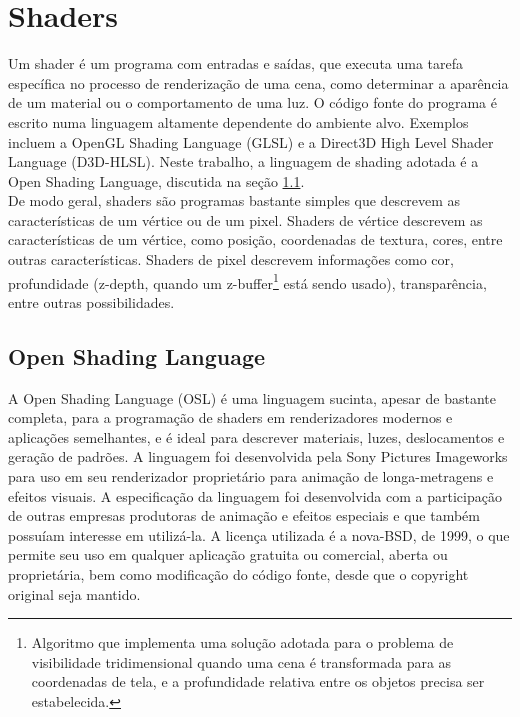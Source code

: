 \documentclass[12pt, a4paper, oneside]{book}
\begin{document}
 \section{Shaders}
 \label{shaders}

Um shader é um programa com entradas e saídas, que executa uma tarefa específica no processo de renderização de uma cena, como determinar a aparência de um material ou o comportamento de uma luz. O código fonte do programa é escrito numa linguagem altamente dependente do ambiente alvo. Exemplos incluem a OpenGL Shading Language (GLSL) e a Direct3D High Level Shader Language (D3D-HLSL). Neste trabalho, a linguagem de shading adotada é a Open Shading Language, discutida na seção \ref{osl}.\\

De modo geral, shaders são programas bastante simples que descrevem as características de um vértice ou de um pixel. Shaders de vértice descrevem as características de um vértice, como posição, coordenadas de textura, cores, entre outras características. Shaders de pixel descrevem informações como cor, profundidade (z-depth, quando um z-buffer\footnote{Algoritmo que implementa uma solução adotada para o problema de visibilidade tridimensional quando uma cena é transformada para as coordenadas de tela, e a profundidade relativa entre os objetos precisa ser estabelecida.} está sendo usado), transparência, entre outras possibilidades. 


\subsection{Open Shading Language} 
\label{osl}

A Open Shading Language (OSL) é uma linguagem sucinta, apesar de bastante completa, para a programação de shaders em renderizadores modernos e aplicações semelhantes, e é ideal para descrever materiais, luzes, deslocamentos e geração de padrões.
A linguagem foi desenvolvida pela Sony Pictures Imageworks para uso em seu renderizador proprietário para animação de longa-metragens e efeitos visuais. A especificação da linguagem foi desenvolvida com a participação de outras empresas produtoras de animação e efeitos especiais e que também possuíam interesse em utilizá-la.
A licença utilizada é a nova-BSD, de 1999, o que permite seu uso em qualquer aplicação gratuita ou comercial, aberta ou proprietária, bem como modificação do código fonte, desde que o copyright original seja mantido. \\
\end{document}
